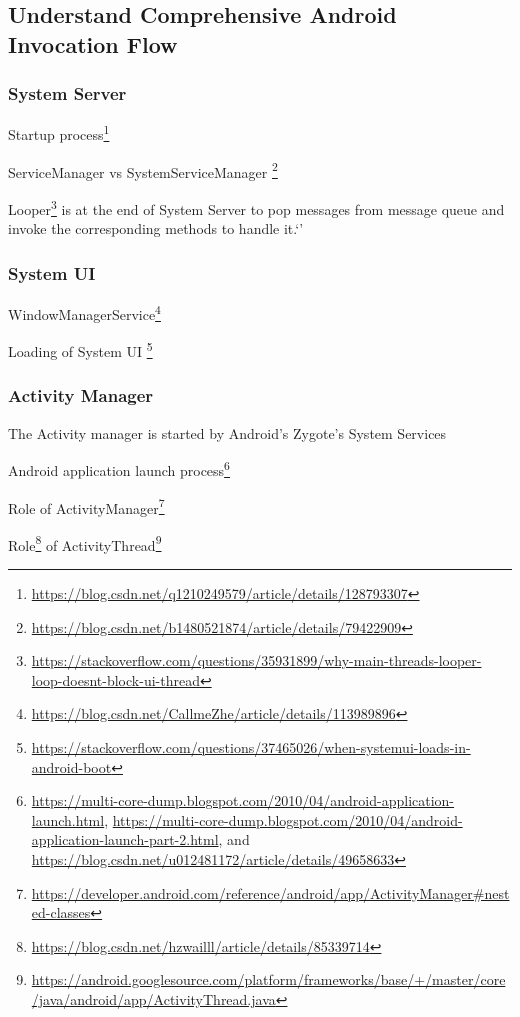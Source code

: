 \subsection{Understand Comprehensive Android Invocation Flow}
\label{task:20240121_aosp}

\subsubsection{System Server}

Startup process\footnote{\url{https://blog.csdn.net/q1210249579/article/details/128793307}}

ServiceManager vs SystemServiceManager \footnote{\url{https://blog.csdn.net/b1480521874/article/details/79422909}}

Looper\footnote{\url{https://stackoverflow.com/questions/35931899/why-main-threads-looper-loop-doesnt-block-ui-thread}} is at the end of System Server to pop messages from message queue and invoke the corresponding methods to handle it.`'

\subsubsection{System UI}

WindowManagerService\footnote{\url{https://blog.csdn.net/CallmeZhe/article/details/113989896}}

Loading of System UI \footnote{\url{https://stackoverflow.com/questions/37465026/when-systemui-loads-in-android-boot}}



\subsubsection{Activity Manager}

The Activity manager is started by Android's Zygote's System Services

Android application launch process\footnote{\url{https://multi-core-dump.blogspot.com/2010/04/android-application-launch.html}, \url{https://multi-core-dump.blogspot.com/2010/04/android-application-launch-part-2.html}, and \url{https://blog.csdn.net/u012481172/article/details/49658633}}

Role of ActivityManager\footnote{\url{https://developer.android.com/reference/android/app/ActivityManager\#nested-classes}}

Role\footnote{\url{https://blog.csdn.net/hzwailll/article/details/85339714}} of ActivityThread\footnote{\url{https://android.googlesource.com/platform/frameworks/base/+/master/core/java/android/app/ActivityThread.java}}


